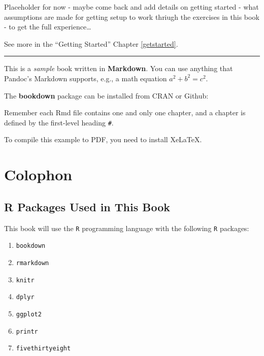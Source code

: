 \documentclass[
]{book}
\providecommand{\tightlist}{%
  \setlength{\itemsep}{0pt}\setlength{\parskip}{0pt}}
\begin{document}
Placeholder for now - maybe come back and add details on getting started - what assumptions are made for getting setup to work thriugh the exercises in this book - to get the full experience\ldots{}

See more in the ``Getting Started'' Chapter \ref{getstarted}.

\begin{center}\rule{0.5\linewidth}{0.5pt}\end{center}

This is a \emph{sample} book written in \textbf{Markdown}. You can use anything that Pandoc's Markdown supports, e.g., a math equation \(a^2 + b^2 = c^2\).

The \textbf{bookdown} package can be installed from CRAN or Github:

Remember each Rmd file contains one and only one chapter, and a chapter is defined by the first-level heading \texttt{\#}.

To compile this example to PDF, you need to install XeLaTeX.

\hypertarget{colophon}{%
\section*{Colophon}\label{colophon}}

\hypertarget{r-packages-used-in-this-book}{%
\subsection*{R Packages Used in This Book}\label{r-packages-used-in-this-book}}

This book will use the \texttt{R} programming language \citep{R-base} with the following \texttt{R} packages:

\begin{enumerate}
\def\labelenumi{\arabic{enumi}.}
\tightlist
\item
  \texttt{bookdown} \citep{R-bookdown}
\item
  \texttt{rmarkdown} \citep{R-rmarkdown}
\item
  \texttt{knitr} \citep{R-knitr}
\item
  \texttt{dplyr} \citep{R-dplyr}
\item
  \texttt{ggplot2} \citep{R-ggplot2}
\item
  \texttt{printr} \citep{R-printr}
\item
  \texttt{fivethirtyeight} \citep{R-fivethirtyeight}
\end{enumerate}
\end{document}
